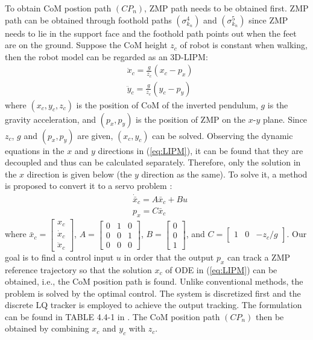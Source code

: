 \documentclass{ieeeaccess}
\begin{document}
To obtain CoM postion path $(CP_n)$, ZMP path needs to be obtained first. ZMP path can be obtained through foothold paths $(\sigma^{4}_{k_n})$ and $(\sigma^{5}_{k_n})$ since ZMP needs to lie in the support face and the foothold path points out when the feet are on the ground. Suppose the CoM height $z_c$ of robot is constant when walking, then the robot model can be regarded as an 3D-LIPM:
\begin{equation} \label{eq:LIPM}
    \begin{split}
        & \ddot{x}_c = \frac{g}{z_c}(x_c - p_x) \\
        & \ddot{y}_c = \frac{g}{z_c}(y_c - p_y)
    \end{split}
\end{equation}
where $(x_c, y_c, z_c)$ is the position of CoM of the inverted pendulum, $g$ is the gravity acceleration, and $(p_x,p_y)$ is the position of ZMP on the $x$-$y$ plane. Since $z_c$, $g$ and $(p_x,p_y)$ are given, $(x_c, y_c)$ can be solved. Observing the dynamic equations in the $x$ and $y$ directions in (\ref{eq:LIPM}), it can be found that they are decoupled and thus can be calculated separately. Therefore, only the solution in the $x$ direction is given below (the $y$ direction as the same). To solve it, a method is proposed to convert it to a servo problem \cite{1241826}:
\begin{equation} \label{eq:output tracking}
    \begin{split}
        & \dot{\bar{x}}_c = A\bar{x}_c + Bu \\
        & p_x = C\bar{x}_c
    \end{split}
\end{equation}
where $\bar{x}_c = \begin{bmatrix}
    x_c \\ \dot{x}_c \\ \ddot{x}_c
\end{bmatrix}$, $A = \begin{bmatrix}
    0 & 1 & 0 \\ 0 & 0 & 1 \\ 0 & 0 & 0
\end{bmatrix}$, $B = \begin{bmatrix}
    0 \\ 0 \\ 1
\end{bmatrix}$, and $C = \begin{bmatrix}
    1 & 0 & -z_c/g
\end{bmatrix}$. Our goal is to find a control input $u$ in order that the output $p_x$ can track a ZMP reference trajectory so that the solution $x_c$ of ODE in (\ref{eq:LIPM}) can be obtained, i.e., the CoM position path is found. Unlike conventional methods, the problem is solved by the optimal control. The system is discretized first and the discrete LQ tracker is employed to achieve the output tracking. The formulation can be found in TABLE 4.4-1 in \cite{lewis2012optimal}. The CoM position path $(CP_n)$ then be obtained by combining $x_c$ and $y_c$ with $z_c$.
\end{document}
